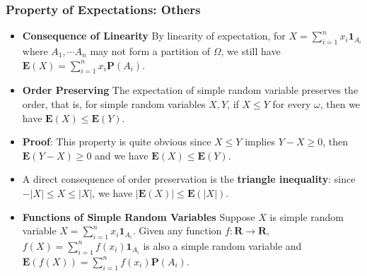 \documentclass[handout]{beamer}
\newcommand{\BP}{\mathbf{P}}
\newcommand{\BE}{\mathbf{E}}
\newcommand{\BI}{\mathbf{1}}
\begin{document}
\frame
{
\frametitle{Property of Expectations: Others}

\begin{itemize}

\item<1-> \textbf{Consequence of Linearity} By linearity of expectation, for $X=\sum_{i=1}^n x_i \BI_{A_i}$ where $A_1, \cdots A_n$ may not form a partition of $\Omega$, we still have  $\BE(X)=\sum_{i=1}^n x_i \BP(A_i)$.
                         

\item<2-> \textbf{Order Preserving} The expectation of simple random variable preserves the order, that is, for simple random variables $X, Y$, if $X\leq Y$ for every $\omega$, then we have $\BE(X)\leq \BE(Y)$.
                         
\item<3-> \textbf{Proof}: This property is quite obvious since $X\leq Y$ implies $Y-X\geq 0$, then $\BE(Y-X)\geq 0$ and we have $\BE(X)\leq \BE(Y)$.
                                                                                                                           
\item<4-> A direct consequence of order preservation is the \textbf{triangle inequality}: since $-|X|\leq X\leq |X|$, we have $|\BE(X)|\leq \BE(|X|)$.     
                                                          

\item<5-> \textbf{Functions of Simple Random Variables} Suppose $X$ is simple random variable $X=\sum_{i=1}^n x_i \BI_{A_i}$. Given any function $f:\mathbf{R}\rightarrow \mathbf{R}$, $f(X)=\sum_{i=1}^n f(x_i) \BI_{A_i}$ is also a simple random variable and $\BE(f(X))=\sum_{i=1}^n f(x_i) \BP(A_i)$.
                                                                                                                                 \end{itemize}
}
\end{document}

